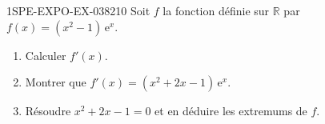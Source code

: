 \begin{exercice}{1SPE-EXPO-EX-038}{2}{10}
Soit $f$ la fonction définie sur $\mathbb{R}$ par $f(x) = (x^2-1)\,\mathrm{e}^{x}$.
\begin{enumerate}
\item Calculer $f'(x)$.
\item Montrer que $f'(x) = (x^2+2x-1)\,\mathrm{e}^{x}$.
\item Résoudre $x^2 + 2x - 1 = 0$ et en déduire les extremums de $f$.
\end{enumerate}
\end{exercice}
